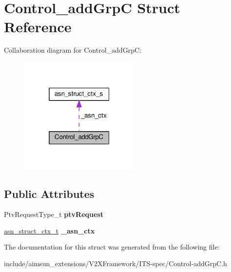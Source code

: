 \hypertarget{structControl__addGrpC}{}\section{Control\+\_\+add\+GrpC Struct Reference}
\label{structControl__addGrpC}


Collaboration diagram for Control\+\_\+add\+GrpC\+:\nopagebreak
\begin{figure}[H]
\begin{center}
\leavevmode
\includegraphics[width=172pt]{structControl__addGrpC__coll__graph}
\end{center}
\end{figure}
\subsection*{Public Attributes}
\begin{DoxyCompactItemize}
\item 
Ptv\+Request\+Type\+\_\+t {\bfseries ptv\+Request}\hypertarget{structControl__addGrpC_a2e765e6111fd901961cd031a6fd65562}{}\label{structControl__addGrpC_a2e765e6111fd901961cd031a6fd65562}

\item 
\hyperlink{structasn__struct__ctx__s}{asn\+\_\+struct\+\_\+ctx\+\_\+t} {\bfseries \+\_\+asn\+\_\+ctx}\hypertarget{structControl__addGrpC_aa30c6ae98bac08ac040cd6ec1772a2e8}{}\label{structControl__addGrpC_aa30c6ae98bac08ac040cd6ec1772a2e8}

\end{DoxyCompactItemize}


The documentation for this struct was generated from the following file\+:\begin{DoxyCompactItemize}
\item 
include/aimsun\+\_\+extensions/\+V2\+X\+Framework/\+I\+T\+S-\/spec/Control-\/add\+Grp\+C.\+h\end{DoxyCompactItemize}
